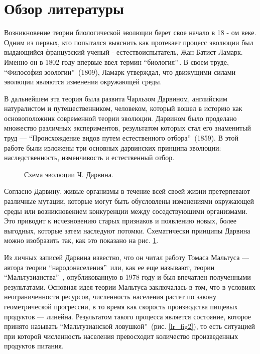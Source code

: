 \chapter*{Обзор литературы}                         %

Возникновение теории биологической эволюции берет свое начало в 18 - ом веке. Одним из первых, кто попытался выяснить как протекает процесс эволюции был выдающийся французский ученый - естествоиспытатель, Жан Батист Ламарк. Именно он в 1802 году впервые ввел термин ``биология''\,. В своем труде, ``Философия зоологии''\, \cite{Lamark} (1809), Ламарк утверждал, что движущими силами эволюции являются изменения окружающей среды.

В дальнейшем эта теория была развита Чарльзом Дарвином, английским натуралистом и путешественником, человеком, который вошел в историю как основоположник современной теории эволюции. Дарвином было проделано множество различных экспериментов, результатом которых стал его знаменитый труд --- ``Происхождение видов путем естественного отбора''\, \cite{Darwin} (1859). В этой работе были изложены три основных дарвинских принципа эволюции: наследственность, изменчивость и естественный отбор.  

\begin{figure}[ht]
\caption{Схема эволюции Ч. Дарвина.}
\label{lr_fig1}
\end{figure}

Согласно Дарвину, живые организмы в течение всей своей жизни претерпевают различные мутации, которые могут быть обусловлены изменениями окружающей среды или возникновением конкуренции между соседствующими организмами. Это приводит к исчезновению старых признаков и появлению новых, более выгодных, которые затем наследуют потомки. Схематически принципы Дарвина можно изобразить так, как это показано на рис. \ref{lr_fig1}.

Из личных записей Дарвина известно, что он читал работу Томаса Мальтуса --- автора теории ``народонаселения''\, или, как ее еще называют, теории ``Мальтузианства''\, \cite{Malthus}, опубликованную в 1978 году и был впечатлен полученными результатами. Основная идея теории Мальтуса заключалась в том, что в условиях неограниченности ресурсов, численность населения растет по закону геометрической прогрессии, в то время как скорость производства пищевых продуктов --- линейна. Результатом такого процесса является состояние, которое принято называть ``Мальтузианской ловушкой''\, (рис. \ref{lr_fig2}), то есть ситуацией при которой численность населения превосходит количество произведенных продуктов питания. 

